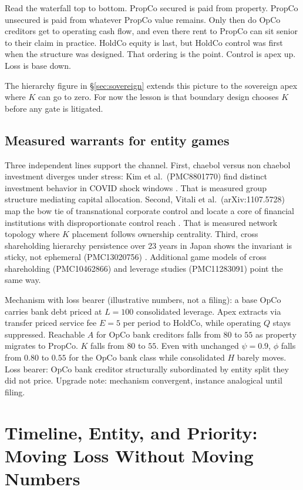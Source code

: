 \documentclass[11pt]{article}
\begin{document}
Read the waterfall top to bottom. PropCo secured is paid from property. PropCo unsecured is paid from whatever PropCo value remains. Only then do OpCo creditors get to operating cash flow, and even there rent to PropCo can sit senior to their claim in practice. HoldCo equity is last, but HoldCo control was first when the structure was designed. That ordering is the point. Control is apex up. Loss is base down.

The hierarchy figure in \S\ref{sec:sovereign} extends this picture to the sovereign apex where $K$ can go to zero. For now the lesson is that boundary design chooses $K$ before any gate is litigated.

\subsection{Measured warrants for entity games}
Three independent lines support the channel. First, chaebol versus non chaebol investment diverges under stress: Kim et al.\ (PMC8801770) find distinct investment behavior in COVID shock windows \citep{kim2022chaebol}. That is measured group structure mediating capital allocation. Second, Vitali et al.\ (arXiv:1107.5728) map the bow tie of transnational corporate control and locate a core of financial institutions with disproportionate control reach \citep{vitali2011}. That is measured network topology where $K$ placement follows ownership centrality. Third, cross shareholding hierarchy persistence over 23 years in Japan shows the invariant is sticky, not ephemeral (PMC13020756) \citep{japan13020756}. Additional game models of cross shareholding (PMC10462866) and leverage studies (PMC11283091) point the same way.

Mechanism with loss bearer (illustrative numbers, not a filing): a base OpCo carries bank debt priced at $L=100$ consolidated leverage. Apex extracts via transfer priced service fee $E=5$ per period to HoldCo, while operating $Q$ stays suppressed. Reachable $A$ for OpCo bank creditors falls from $80$ to $55$ as property migrates to PropCo. $K$ falls from $80$ to $55$. Even with unchanged $\psi=0.9$, $\phi$ falls from $0.80$ to $0.55$ for the OpCo bank class while consolidated $H$ barely moves. Loss bearer: OpCo bank creditor structurally subordinated by entity split they did not price. Upgrade note: mechanism convergent, instance analogical until filing.

\section{Timeline, Entity, and Priority: Moving Loss Without Moving Numbers}
\label{sec:timeline-entity-priority}
\end{document}
